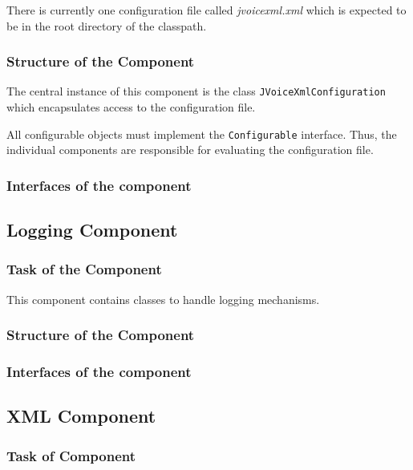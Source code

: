 \documentclass[11pt,a4paper]{article}
\begin{document}
There is currently one configuration file called \emph{jvoicexml.xml}
which is expected to be in the root directory of the classpath.

\subsubsection{Structure of the Component}

The central instance of this component is the class
\texttt{JVoiceXml\-Configurat\-ion} which encapsulates access to the
configuration file.

All configurable objects must implement the \texttt{Configurable}
interface. Thus, the individual components are responsible for
evaluating the configuration file.

\subsubsection{Interfaces of the component}

\subsection{Logging Component}
\label{sec:logging-component}

\subsubsection{Task of the Component}

This component contains classes to handle logging mechanisms.

\subsubsection{Structure of the Component}

\subsubsection{Interfaces of the component}

\subsection{XML Component}
\label{sec:xml-component}

\subsubsection{Task of Component}
\end{document}
